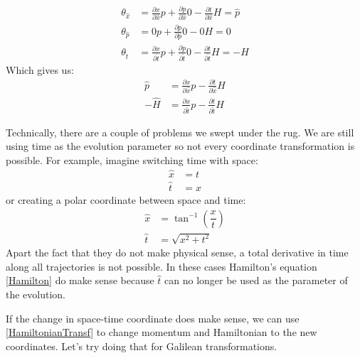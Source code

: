 \documentclass[aps,pra,10pt,floatfix,nofootinbib]{revtex4-1}
\theoremstyle{definition}
\begin{document}
\begin{equation}
\begin{aligned}
\theta_{\hat{x}} &= \frac{\partial x}{\partial \hat{x}}p + \frac{\partial p}{\partial \hat{x}}0 - \frac{\partial t}{\partial \hat{x}}H = \hat{p} \\
\theta_{\hat{p}} &= 0 p + \frac{\partial p}{\partial \hat{p}}0 - 0 H = 0 \\
\theta_{\hat{t}} &= \frac{\partial x}{\partial \hat{t}}p + \frac{\partial p}{\partial \hat{t}}0 - \frac{\partial t}{\partial \hat{t}}H = -\hat{H}
\end{aligned}
\end{equation}
Which gives us:
\begin{equation}
\begin{aligned}
\hat{p} &= \frac{\partial x}{\partial \hat{x}}p - \frac{\partial t}{\partial \hat{x}}H \\
-\hat{H} &= \frac{\partial x}{\partial \hat{t}}p  - \frac{\partial t}{\partial \hat{t}}H
\end{aligned}
\label{HamiltonianTransf}
\end{equation}

Technically, there are a couple of problems we swept under the rug. We are still using time as the evolution parameter so not every coordinate transformation is possible. For example, imagine switching time with space:
\begin{equation}
\begin{aligned}
\hat{x} &= t \\
\hat{t} &= x
\end{aligned}
\end{equation}
or creating a polar coordinate between space and time:
\begin{equation}
\begin{aligned}
\hat{x} &= \tan^{-1}(\dfrac{x}{t}) \\
\hat{t} &= \sqrt{x^2 + t^2}
\end{aligned}
\end{equation}
Apart the fact that they do not make physical sense, a total derivative in time along all trajectories is not possible. In these cases Hamilton's equation \eqref{Hamilton} do make sense because $\hat{t}$ can no longer be used as the parameter of the evolution.

If the change in space-time coordinate does make sense, we can use \eqref{HamiltonianTransf} to change momentum and Hamiltonian to the new coordinates. Let's try doing that for Galilean transformations.
\end{document}
